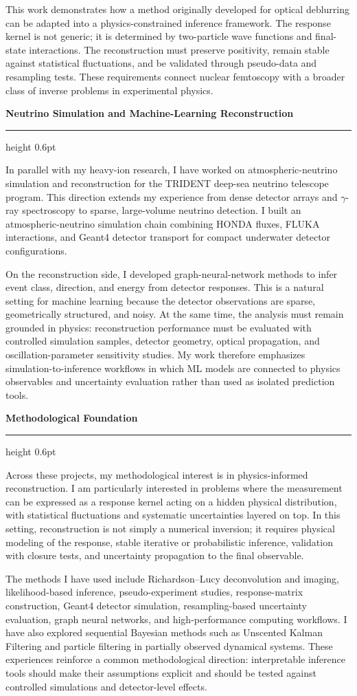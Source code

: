 \documentclass[10pt]{article}
\newcommand{\rssection}[1]{%
  \vspace{0.85em}
  {\large\bfseries\color{accent} #1}\par
  \vspace{0.2em}
  {\color{rule}\hrule height 0.6pt}
  \vspace{0.45em}
}
\newcommand{\bodypar}[1]{%
  {\normalsize #1\par}
  \vspace{0.58em}
}
\begin{document}
\bodypar{This work demonstrates how a method originally developed for optical deblurring can be adapted into a physics-constrained inference framework. The response kernel is not generic; it is determined by two-particle wave functions and final-state interactions. The reconstruction must preserve positivity, remain stable against statistical fluctuations, and be validated through pseudo-data and resampling tests. These requirements connect nuclear femtoscopy with a broader class of inverse problems in experimental physics.}

\newpage

\rssection{Neutrino Simulation and Machine-Learning Reconstruction}
\bodypar{In parallel with my heavy-ion research, I have worked on atmospheric-neutrino simulation and reconstruction for the TRIDENT deep-sea neutrino telescope program. This direction extends my experience from dense detector arrays and $\gamma$-ray spectroscopy to sparse, large-volume neutrino detection. I built an atmospheric-neutrino simulation chain combining HONDA fluxes, FLUKA interactions, and Geant4 detector transport for compact underwater detector configurations.}

\bodypar{On the reconstruction side, I developed graph-neural-network methods to infer event class, direction, and energy from detector responses. This is a natural setting for machine learning because the detector observations are sparse, geometrically structured, and noisy. At the same time, the analysis must remain grounded in physics: reconstruction performance must be evaluated with controlled simulation samples, detector geometry, optical propagation, and oscillation-parameter sensitivity studies. My work therefore emphasizes simulation-to-inference workflows in which ML models are connected to physics observables and uncertainty evaluation rather than used as isolated prediction tools.}

\rssection{Methodological Foundation}
\bodypar{Across these projects, my methodological interest is in physics-informed reconstruction. I am particularly interested in problems where the measurement can be expressed as a response kernel acting on a hidden physical distribution, with statistical fluctuations and systematic uncertainties layered on top. In this setting, reconstruction is not simply a numerical inversion; it requires physical modeling of the response, stable iterative or probabilistic inference, validation with closure tests, and uncertainty propagation to the final observable.}

\bodypar{The methods I have used include Richardson--Lucy deconvolution and imaging, likelihood-based inference, pseudo-experiment studies, response-matrix construction, Geant4 detector simulation, resampling-based uncertainty evaluation, graph neural networks, and high-performance computing workflows. I have also explored sequential Bayesian methods such as Unscented Kalman Filtering and particle filtering in partially observed dynamical systems. These experiences reinforce a common methodological direction: interpretable inference tools should make their assumptions explicit and should be tested against controlled simulations and detector-level effects.}
\end{document}
